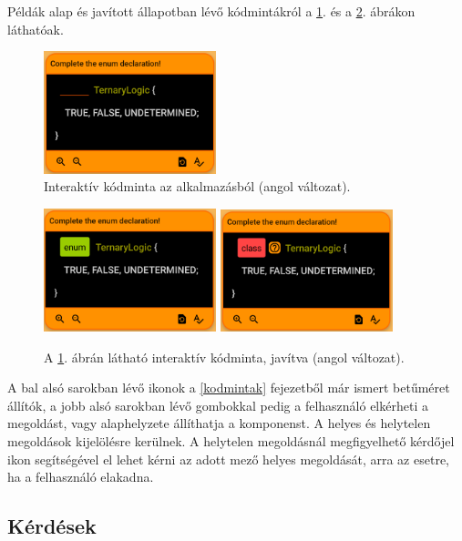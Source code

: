\documentclass[12pt,a4paper]{article}
\begin{document}
	Példák alap és javított állapotban lévő kódmintákról a \ref{interactive_component_figure}. és a \ref{interactive_component_completed_figure}. ábrákon láthatóak. 
	
	\begin{figure}
		\centering
		\includegraphics[width=5cm]{interactive_not_completed}
		\caption{Interaktív kódminta az alkalmazásból (angol változat).}
		\label{interactive_component_figure}
	\end{figure}
	
	\begin{figure}
		\centering
		\includegraphics[width=5cm]{interactive_correct}
		\includegraphics[width=5cm]{interactive_incorrect}
		\caption{A \ref{interactive_component_figure}. ábrán látható interaktív kódminta, javítva (angol változat).}
		\label{interactive_component_completed_figure}
	\end{figure}
	
	A bal alsó sarokban lévő ikonok a \ref{kodmintak} fejezetből már ismert betűméret állítók, a jobb alsó sarokban lévő gombokkal pedig a felhasználó elkérheti a megoldást, vagy alaphelyzete állíthatja a komponenst. A helyes és helytelen megoldások kijelölésre kerülnek. A helytelen megoldásnál megfigyelhető kérdőjel ikon segítségével el lehet kérni az adott mező helyes megoldását, arra az esetre, ha a felhasználó elakadna.
	
	\subsection{Kérdések}\label{kerdesek}
	
\end{document}
